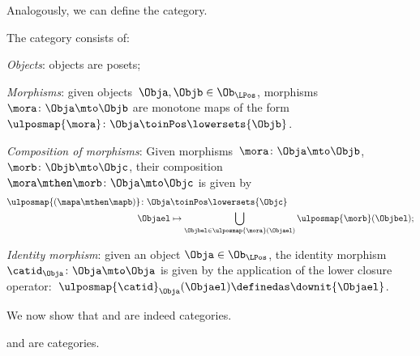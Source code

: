 Analogously, we can define the \LPos category.
\begin{definition}
    \label{def:lpos_cat}
    The category \LPos consists of:
    \begin{compactenum}
        \item \emph{Objects}: objects are posets;
        \item \emph{Morphisms}: given objects~$\Obja,\Objb\in \Ob_{\LPos}$, morphisms~$\mora\colon \Obja\mto \Objb$ are monotone maps of the form~$\ulposmap{\mora} \colon \Obja \toinPos \lowersets{\Objb}$.
        \item \emph{Composition of morphisms}: Given morphisms~$\mora \colon \Obja \mto \Objb$,~$\morb \colon \Objb\mto \Objc$, their composition~$\mora\mthen \morb\colon \Obja\mto \Objc$ is given by
        \begin{equation}
            \begin{aligned}
                \ulposmap{(\mapa \mthen \mapb)} \colon \Obja &\toinPos \lowersets{\Objc}\\
                \Objael&\mapsto \bigcup_{\Objbel\in \ulposmap{\mora} (\Objael)}\ulposmap{\morb}(\Objbel);
            \end{aligned}
        \end{equation}
        \item \emph{Identity morphism}: given an object $\Obja\in \Ob_{\LPos}$, the identity morphism~$\catid_\Obja \colon \Obja \mto \Obja$ is given by the application of the lower closure operator:~$\ulposmap{\catid}_\Obja(\Objael)\definedas \downit\{\Objael\}$.
    \end{compactenum}
\end{definition}

We now show that \UPos and \LPos are indeed categories.

\begin{lemma}
    \label{lem:upos_lpos_cats}
    \UPos and \LPos are categories.
\end{lemma}

